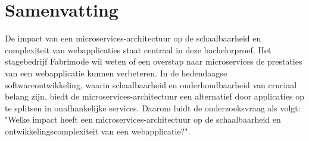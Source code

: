 
%
%
%
%
%

%



\chapter{Samenvatting}

De impact van een microservices-architectuur op de schaalbaarheid en complexiteit van webapplicaties staat centraal in deze bachelorproef. Het stagebedrijf Fabrimode wil weten of een overstap naar microservices de prestaties van een webapplicatie kunnen verbeteren. In de hedendaagse softwareontwikkeling, waarin schaalbaarheid en onderhoudbaarheid van cruciaal belang zijn, biedt de microservices-architectuur een alternatief door applicaties op te splitsen in onafhankelijke services. Daarom luidt de onderzoeksvraag als volgt: "Welke impact heeft een microservices\--architectuur op de schaalbaarheid en ontwikkelingscomplexiteit van een webapplicatie?".\newline

